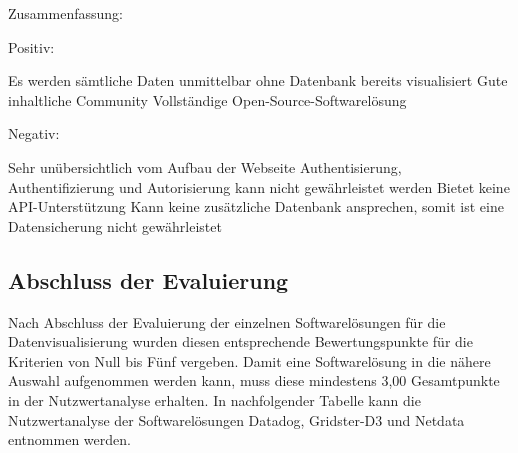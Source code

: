 Zusammenfassung:

Positiv:

\begin{outline}
  \1 Es werden sämtliche Daten unmittelbar ohne Datenbank bereits visualisiert
  \1 Gute inhaltliche Community
  \1 Vollständige Open\hyp{}Source\hyp{}Softwarelösung
\end{outline}

Negativ:

\begin{outline}
  \1 Sehr unübersichtlich vom Aufbau der Webseite
  \1 Authentisierung, Authentifizierung und Autorisierung kann nicht
  gewährleistet werden
  \1 Bietet keine \gls{API}\hyp{}Unterstützung
  \1 Kann keine zusätzliche Datenbank ansprechen, somit ist eine Datensicherung
  nicht gewährleistet
\end{outline}
\mr%

\subsection{Abschluss der Evaluierung}
\label{subsec:abschluss_evaluierung}
Nach Abschluss der Evaluierung der einzelnen Softwarelösungen für die
Datenvisualisierung wurden diesen entsprechende Bewertungspunkte für die
Kriterien von Null bis Fünf vergeben. Damit eine Softwarelösung in die nähere
Auswahl aufgenommen werden kann, muss diese mindestens 3,00 Gesamtpunkte in der
Nutzwertanalyse erhalten. In nachfolgender Tabelle kann die
Nutzwertanalyse der Softwarelösungen Datadog, Gridster\hyp{}D3 und Netdata
entnommen werden.

